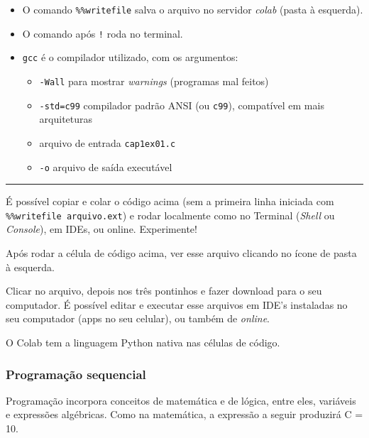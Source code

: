 \documentclass[12pt,a4paper]{article}
\providecommand{\tightlist}{%
      \setlength{\itemsep}{0pt}\setlength{\parskip}{0pt}}
\begin{document}
    \begin{itemize}
\tightlist
\item
  O comando \texttt{\%\%writefile} salva o arquivo no servidor
  \emph{colab} (pasta à esquerda).
\item
  O comando após \texttt{!} roda no terminal.
\item
  \texttt{gcc} é o compilador utilizado, com os argumentos:

  \begin{itemize}
  \tightlist
  \item
    \texttt{-Wall} para mostrar \emph{warnings} (programas mal feitos)
  \item
    \texttt{-std=c99} compilador padrão ANSI (ou \texttt{c99}),
    compatível em mais arquiteturas
  \item
    arquivo de entrada \texttt{cap1ex01.c}
  \item
    \texttt{-o} arquivo de saída executável
  \end{itemize}
\end{itemize}

    \begin{center}\rule{0.5\linewidth}{0.5pt}\end{center}

É possível copiar e colar o código acima (sem a primeira linha iniciada
com \texttt{\%\%writefile\ arquivo.ext}) e rodar localmente como no
Terminal (\emph{Shell} ou \emph{Console}), em IDEs, ou online.
Experimente!

    Após rodar a célula de código acima, ver esse arquivo clicando no ícone
de pasta à esquerda.

    Clicar no arquivo, depois nos três pontinhos e fazer download para o seu
computador. É possível editar e executar esse arquivos em IDE's
instaladas no seu computador (apps no seu celular), ou também de
\emph{online}.

    O Colab tem a linguagem Python nativa nas células de código.

    \hypertarget{programauxe7uxe3o-sequencial}{%
\subsubsection{Programação
sequencial}\label{programauxe7uxe3o-sequencial}}

    Programação incorpora conceitos de matemática e de lógica, entre eles,
variáveis e expressões algébricas. Como na matemática, a expressão a
seguir produzirá C = 10.
\end{document}
